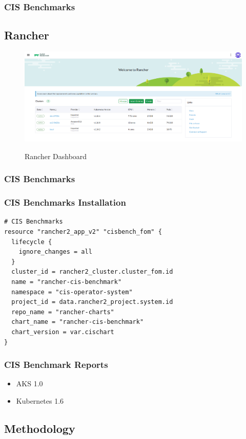 \subsubsection{CIS Benchmarks}

\subsection{Rancher}

\begin{figure}[H]
\centering
\caption {Rancher Dashboard}
\includegraphics[width=\linewidth]{images/rancher-dashboard.png}
\label{fig:rancherDashboard}
\end{figure}

\subsubsection{CIS Benchmarks}

\subsubsection{CIS Benchmarks Installation}

\begin{lstlisting}[caption=Installing CIS Benchmarks, frame=single, basicstyle=\ttfamily]
# CIS Benchmarks
resource "rancher2_app_v2" "cisbench_fom" {
  lifecycle {
    ignore_changes = all
  }
  cluster_id = rancher2_cluster.cluster_fom.id
  name = "rancher-cis-benchmark"
  namespace = "cis-operator-system"
  project_id = data.rancher2_project.system.id
  repo_name = "rancher-charts"
  chart_name = "rancher-cis-benchmark"
  chart_version = var.cischart
}
\end{lstlisting}

\subsubsection{CIS Benchmark Reports}

\begin{itemize}
 \item AKS 1.0
 \item Kubernetes 1.6
\end{itemize}

\subsection{Methodology}
